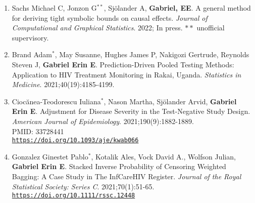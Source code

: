 \documentclass[12pt]{article}
\providecommand \url[1]{\href{#1}{#1}}
\renewcommand*\url[1]{\href{#1}{\texttt{#1}}}
\begin{document}
\begin{enumerate}
\item Sachs Michael C, Jonzon G$^{**}$,  Sjölander A,  \textbf{Gabriel, EE}. A general method for deriving tight symbolic bounds on causal effects. \emph{Journal of Computational and Graphical Statistics}. 2022; In press. $**$ unofficial supervisory.\\


\item Brand Adam$^*$, May Susanne, Hughes James P, Nakigozi Gertrude,  Reynolds Steven J, \textbf{Gabriel Erin E}. Prediction-Driven Pooled Testing Methods: Application to HIV Treatment Monitoring in Rakai, Uganda. \emph{Statistics in Medicine}. 2021;40(19):4185-4199.




\item Cioc\u{a}nea-Teodorescu Iuliana$^*$,  Nason  Martha,  Sjölander Arvid,  \textbf{Gabriel Erin E}. Adjustment for Disease Severity in the Test-Negative Study Design. \emph{American Journal of Epidemiology}. 2021;190(9):1882-1889.\\
PMID: 33728441 \\
\url{https://doi.org/10.1093/aje/kwab066}

\item Gonzalez Ginestet Pablo$^*$, Kotalik Ales, Vock David A., Wolfson Julian, \textbf{Gabriel Erin E}. Stacked Inverse Probability of Censoring Weighted Bagging: A Case Study in The InfCareHIV Register. \emph{Journal of the Royal Statistical Society: Series C}. 2021;70(1):51-65.\\
\url{https://doi.org/10.1111/rssc.12448}
\end{enumerate}
\end{document}
